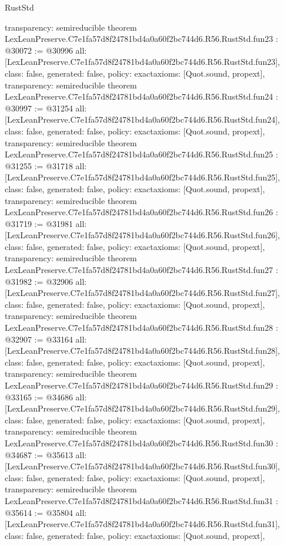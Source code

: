 \begin{lexlean}{RustStd}
\begin{coremodule}
{  transparency: semireducible
}
theorem LexLeanPreserve.C7e1fa57d8f24781bd4a0a60f2bc744d6.R56.RustStd.fun23 : @30072 := @30996 {
  all: [LexLeanPreserve.C7e1fa57d8f24781bd4a0a60f2bc744d6.R56.RustStd.fun23],
  class: false,
  generated: false,
  policy: exact{axioms: [Quot.sound, propext]},
  transparency: semireducible
}
theorem LexLeanPreserve.C7e1fa57d8f24781bd4a0a60f2bc744d6.R56.RustStd.fun24 : @30997 := @31254 {
  all: [LexLeanPreserve.C7e1fa57d8f24781bd4a0a60f2bc744d6.R56.RustStd.fun24],
  class: false,
  generated: false,
  policy: exact{axioms: [Quot.sound, propext]},
  transparency: semireducible
}
theorem LexLeanPreserve.C7e1fa57d8f24781bd4a0a60f2bc744d6.R56.RustStd.fun25 : @31255 := @31718 {
  all: [LexLeanPreserve.C7e1fa57d8f24781bd4a0a60f2bc744d6.R56.RustStd.fun25],
  class: false,
  generated: false,
  policy: exact{axioms: [Quot.sound, propext]},
  transparency: semireducible
}
theorem LexLeanPreserve.C7e1fa57d8f24781bd4a0a60f2bc744d6.R56.RustStd.fun26 : @31719 := @31981 {
  all: [LexLeanPreserve.C7e1fa57d8f24781bd4a0a60f2bc744d6.R56.RustStd.fun26],
  class: false,
  generated: false,
  policy: exact{axioms: [Quot.sound, propext]},
  transparency: semireducible
}
theorem LexLeanPreserve.C7e1fa57d8f24781bd4a0a60f2bc744d6.R56.RustStd.fun27 : @31982 := @32906 {
  all: [LexLeanPreserve.C7e1fa57d8f24781bd4a0a60f2bc744d6.R56.RustStd.fun27],
  class: false,
  generated: false,
  policy: exact{axioms: [Quot.sound, propext]},
  transparency: semireducible
}
theorem LexLeanPreserve.C7e1fa57d8f24781bd4a0a60f2bc744d6.R56.RustStd.fun28 : @32907 := @33164 {
  all: [LexLeanPreserve.C7e1fa57d8f24781bd4a0a60f2bc744d6.R56.RustStd.fun28],
  class: false,
  generated: false,
  policy: exact{axioms: [Quot.sound, propext]},
  transparency: semireducible
}
theorem LexLeanPreserve.C7e1fa57d8f24781bd4a0a60f2bc744d6.R56.RustStd.fun29 : @33165 := @34686 {
  all: [LexLeanPreserve.C7e1fa57d8f24781bd4a0a60f2bc744d6.R56.RustStd.fun29],
  class: false,
  generated: false,
  policy: exact{axioms: [Quot.sound, propext]},
  transparency: semireducible
}
theorem LexLeanPreserve.C7e1fa57d8f24781bd4a0a60f2bc744d6.R56.RustStd.fun30 : @34687 := @35613 {
  all: [LexLeanPreserve.C7e1fa57d8f24781bd4a0a60f2bc744d6.R56.RustStd.fun30],
  class: false,
  generated: false,
  policy: exact{axioms: [Quot.sound, propext]},
  transparency: semireducible
}
theorem LexLeanPreserve.C7e1fa57d8f24781bd4a0a60f2bc744d6.R56.RustStd.fun31 : @35614 := @35804 {
  all: [LexLeanPreserve.C7e1fa57d8f24781bd4a0a60f2bc744d6.R56.RustStd.fun31],
  class: false,
  generated: false,
  policy: exact{axioms: [Quot.sound, propext]},
}
\end{coremodule}
\end{lexlean}
